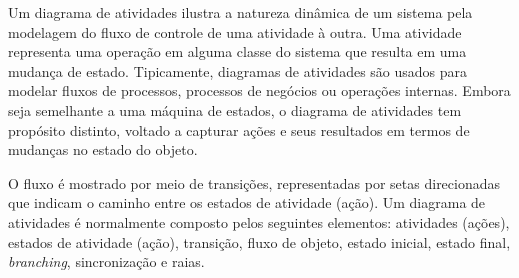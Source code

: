 Um diagrama de atividades ilustra a natureza dinâmica de um sistema pela
modelagem do fluxo de controle de uma atividade à outra. Uma atividade
representa uma operação em alguma classe do sistema que resulta em uma mudança de
estado. Tipicamente, diagramas de atividades são usados para modelar fluxos de
processos, processos de negócios ou operações internas. Embora seja semelhante a
uma máquina de estados, o diagrama de atividades tem propósito distinto, voltado
a capturar ações e seus resultados em termos de mudanças no estado do objeto.

O fluxo é mostrado por meio de transições, representadas por setas direcionadas
que indicam o caminho entre os estados de atividade (ação). Um diagrama de
atividades é normalmente composto pelos seguintes elementos: atividades (ações),
estados de atividade (ação), transição, fluxo de objeto, estado inicial, estado
final, \textit{branching}, sincronização e raias.

